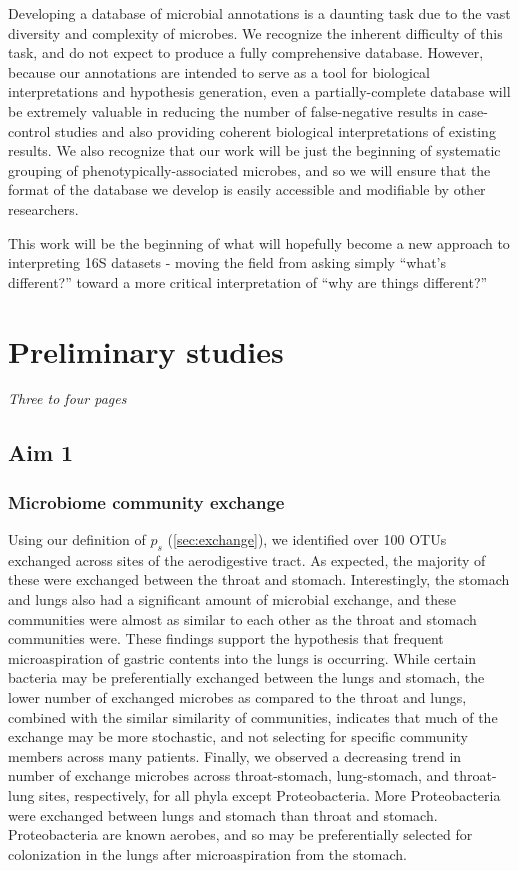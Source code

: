 \documentclass[12pt]{article}
\begin{document}
Developing a database of microbial annotations is a daunting task due 
to the vast diversity and complexity of microbes. We recognize the 
inherent difficulty of this task, and do not expect to produce a fully 
comprehensive database. However, because our annotations are intended 
to serve as a tool for biological interpretations and hypothesis 
generation, even a partially-complete database will be extremely 
valuable in reducing the number of false-negative results in case-
control studies and also providing coherent biological interpretations 
of existing results. We also recognize that our work will be just the 
beginning of systematic grouping of phenotypically-associated 
microbes, and so we will ensure that the format of the database we 
develop is easily accessible and modifiable by other researchers.

This work will be the beginning of what will hopefully become a new 
approach to interpreting 16S datasets - moving the field from asking 
simply ``what's different?'' toward a more critical interpretation of 
``why are things different?''

\section{Preliminary studies}
\textit{Three to four pages}

\subsection{Aim 1}
\subsubsection{Microbiome community exchange}
Using our definition of $p_s$ (\ref{sec:exchange}), we identified over 100
OTUs exchanged across sites of the aerodigestive tract.
As expected, the majority of these were exchanged between the throat and stomach.
Interestingly, the stomach and lungs also had a significant
amount of microbial exchange, and these communities were almost as similar to
each other as the throat and stomach communities were. 
These findings support the hypothesis that frequent microaspiration
of gastric contents into the lungs is occurring. While certain bacteria
may be preferentially exchanged between the lungs and stomach, the lower 
number of exchanged microbes as compared to the throat and lungs, combined with
the similar similarity of communities, indicates that much of the exchange may
be more stochastic, and not selecting for specific community members
across many patients.
Finally, we observed a decreasing trend in number of exchange microbes 
across throat-stomach, lung-stomach, and throat-lung sites, respectively, 
for all phyla except Proteobacteria. More Proteobacteria were exchanged 
between lungs and stomach than throat and stomach. Proteobacteria are 
known aerobes, and so may be preferentially selected for colonization in 
the lungs after microaspiration from the stomach.
\end{document}
